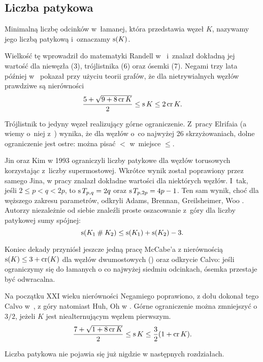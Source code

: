 
\subsection{Liczba patykowa}


\begin{definition}
    Minimalną liczbę odcinków w~łamanej, która przedstawia węzeł $K$, nazywamy jego liczbą patykową i~oznaczamy $\operatorname{s}(K)$.
\end{definition}

Wielkość tę wprowadził do matematyki Randell w~\cite{randell98} i~znalazł dokładną jej wartość dla niewęzła (3), trójlistnika (6) oraz ósemki (7).
Negami trzy lata później w~\cite{negami91} pokazał przy użyciu teorii grafów, że dla nietrywialnych węzłów prawdziwe są nierówności
\begin{equation}
    \frac{5+\sqrt{9 + 8 \operatorname{cr} K}}{2} \le \operatorname{s} K \le 2 \operatorname{cr} K.
\end{equation}

Trójlistnik to jedyny węzeł realizujący górne ograniczenie.
Z~pracy Elrifaia \cite{elrifai06} (a wiemy o~niej z~\cite[s. 1]{huh11}) wynika, że dla węzłów o~co najwyżej 26 skrzyżowaniach, dolne ograniczenie jest ostre: można pisać $<$ w~miejsce $\le$.

Jin oraz Kim w 1993 ograniczyli liczby patykowe dla węzłów torusowych korzystając z~liczby supermostowej.
Wkrótce wynik został poprawiony przez samego Jina, w pracy \cite{jin97} znalazł dokładne wartości dla niektórych węzłów.
I~tak, jeśli $2 \le p < q < 2p$, to $\operatorname{s} T_{p,q} = 2q$ oraz $\operatorname{s} T_{p, 2p} = 4p-1$.
Ten sam wynik, choć dla węższego zakresu parametrów, odkryli Adams, Brennan, Greilsheimer, Woo \cite{greilsheimer97}.
%
Autorzy niezależnie od siebie znaleźli proste oszacowanie z~góry dla liczby patykowej sumy spójnej:
\begin{equation}
    \operatorname{s}(K_1 \mathbin{\#} K_2) \le \operatorname{s}(K_1) + \operatorname{s}(K_2) - 3.
\end{equation}

Koniec dekady przyniósł jeszcze jedną pracę McCabe'a z nierównością $\operatorname{s}(K) \le 3 + \operatorname{cr} (K)$ dla węzłów dwumostowych (\cite{mccabe98}) oraz odkrycie Calvo: jeśli ograniczymy się do łamanych o co najwyżej siedmiu odcinkach, ósemka przestaje być odwracalna.

Na początku XXI wieku nierówności Negamiego poprawiono, z dołu dokonał tego Calvo w~\cite{calvo01}, z góry natomiast Huh, Oh w \cite{huh11}.
Górne ograniczenie można zmniejszyć o $3/2$, jeżeli $K$ jest niealternującym węzłem pierwszym.
\begin{equation}
    \frac{7+\sqrt{1 + 8 \operatorname{cr} K}}{2} \le \operatorname{s} K \le \frac{3}{2} (1 + \operatorname{cr} K).
\end{equation}

Liczba patykowa nie pojawia się już nigdzie w następnych rozdziałach.



